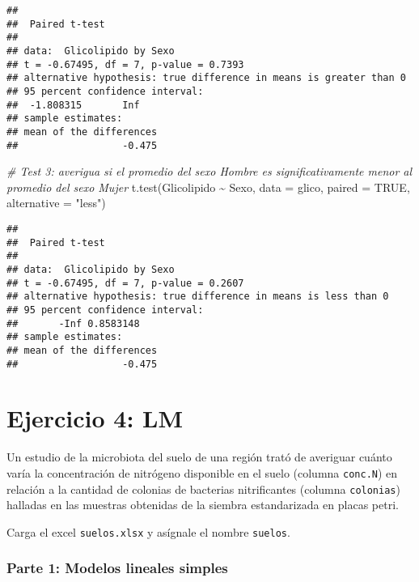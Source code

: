 \documentclass[
]{article}
\newenvironment{Shaded}{}{}
\newcommand{\AttributeTok}[1]{\textcolor[rgb]{0.49,0.56,0.16}{#1}}
\newcommand{\CommentTok}[1]{\textcolor[rgb]{0.38,0.63,0.69}{\textit{#1}}}
\newcommand{\ConstantTok}[1]{\textcolor[rgb]{0.53,0.00,0.00}{#1}}
\newcommand{\FunctionTok}[1]{\textcolor[rgb]{0.02,0.16,0.49}{#1}}
\newcommand{\NormalTok}[1]{#1}
\newcommand{\SpecialCharTok}[1]{\textcolor[rgb]{0.25,0.44,0.63}{#1}}
\newcommand{\StringTok}[1]{\textcolor[rgb]{0.25,0.44,0.63}{#1}}
\begin{document}
\begin{verbatim}
## 
##  Paired t-test
## 
## data:  Glicolipido by Sexo
## t = -0.67495, df = 7, p-value = 0.7393
## alternative hypothesis: true difference in means is greater than 0
## 95 percent confidence interval:
##  -1.808315       Inf
## sample estimates:
## mean of the differences 
##                  -0.475
\end{verbatim}

\begin{Shaded}
\begin{Highlighting}[]
\CommentTok{\# Test 3: averigua si el promedio del sexo Hombre es significativamente menor al promedio del sexo Mujer}
\FunctionTok{t.test}\NormalTok{(Glicolipido }\SpecialCharTok{\textasciitilde{}}\NormalTok{ Sexo, }\AttributeTok{data =}\NormalTok{ glico, }
       \AttributeTok{paired =} \ConstantTok{TRUE}\NormalTok{, }\AttributeTok{alternative =} \StringTok{"less"}\NormalTok{)}
\end{Highlighting}
\end{Shaded}

\begin{verbatim}
## 
##  Paired t-test
## 
## data:  Glicolipido by Sexo
## t = -0.67495, df = 7, p-value = 0.2607
## alternative hypothesis: true difference in means is less than 0
## 95 percent confidence interval:
##       -Inf 0.8583148
## sample estimates:
## mean of the differences 
##                  -0.475
\end{verbatim}

\hypertarget{ejercicio-4-lm}{%
\section{\texorpdfstring{\textbf{Ejercicio 4:
LM}}{Ejercicio 4: LM}}\label{ejercicio-4-lm}}

Un estudio de la microbiota del suelo de una región trató de averiguar
cuánto varía la concentración de nitrógeno disponible en el suelo
(columna \texttt{conc.N}) en relación a la cantidad de colonias de
bacterias nitrificantes (columna \texttt{colonias}) halladas en las
muestras obtenidas de la siembra estandarizada en placas petri.

Carga el excel \texttt{suelos.xlsx} y asígnale el nombre
\texttt{suelos}.

\hypertarget{parte-1-modelos-lineales-simples}{%
\subsubsection{\texorpdfstring{\textbf{Parte 1: Modelos lineales
simples}}{Parte 1: Modelos lineales simples}}\label{parte-1-modelos-lineales-simples}}
\end{document}
